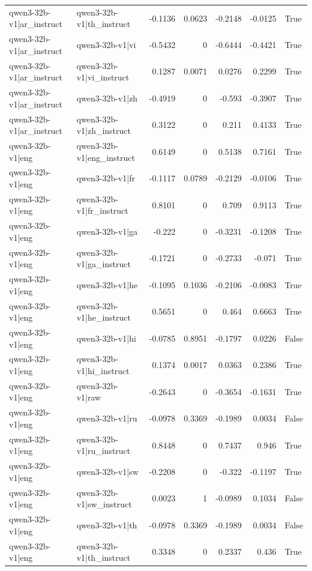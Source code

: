 \begin{table}
\begin{tabular}{l l r r r r l}
qwen3-32b-v1|ar_instruct & qwen3-32b-v1|th_instruct & -0.1136 & 0.0623 & -0.2148 & -0.0125 & True \\
qwen3-32b-v1|ar_instruct & qwen3-32b-v1|vi & -0.5432 & 0 & -0.6444 & -0.4421 & True \\
qwen3-32b-v1|ar_instruct & qwen3-32b-v1|vi_instruct & 0.1287 & 0.0071 & 0.0276 & 0.2299 & True \\
qwen3-32b-v1|ar_instruct & qwen3-32b-v1|zh & -0.4919 & 0 & -0.593 & -0.3907 & True \\
qwen3-32b-v1|ar_instruct & qwen3-32b-v1|zh_instruct & 0.3122 & 0 & 0.211 & 0.4133 & True \\
qwen3-32b-v1|eng & qwen3-32b-v1|eng_instruct & 0.6149 & 0 & 0.5138 & 0.7161 & True \\
qwen3-32b-v1|eng & qwen3-32b-v1|fr & -0.1117 & 0.0789 & -0.2129 & -0.0106 & True \\
qwen3-32b-v1|eng & qwen3-32b-v1|fr_instruct & 0.8101 & 0 & 0.709 & 0.9113 & True \\
qwen3-32b-v1|eng & qwen3-32b-v1|ga & -0.222 & 0 & -0.3231 & -0.1208 & True \\
qwen3-32b-v1|eng & qwen3-32b-v1|ga_instruct & -0.1721 & 0 & -0.2733 & -0.071 & True \\
qwen3-32b-v1|eng & qwen3-32b-v1|he & -0.1095 & 0.1036 & -0.2106 & -0.0083 & True \\
qwen3-32b-v1|eng & qwen3-32b-v1|he_instruct & 0.5651 & 0 & 0.464 & 0.6663 & True \\
qwen3-32b-v1|eng & qwen3-32b-v1|hi & -0.0785 & 0.8951 & -0.1797 & 0.0226 & False \\
qwen3-32b-v1|eng & qwen3-32b-v1|hi_instruct & 0.1374 & 0.0017 & 0.0363 & 0.2386 & True \\
qwen3-32b-v1|eng & qwen3-32b-v1|raw & -0.2643 & 0 & -0.3654 & -0.1631 & True \\
qwen3-32b-v1|eng & qwen3-32b-v1|ru & -0.0978 & 0.3369 & -0.1989 & 0.0034 & False \\
qwen3-32b-v1|eng & qwen3-32b-v1|ru_instruct & 0.8448 & 0 & 0.7437 & 0.946 & True \\
qwen3-32b-v1|eng & qwen3-32b-v1|sw & -0.2208 & 0 & -0.322 & -0.1197 & True \\
qwen3-32b-v1|eng & qwen3-32b-v1|sw_instruct & 0.0023 & 1 & -0.0989 & 0.1034 & False \\
qwen3-32b-v1|eng & qwen3-32b-v1|th & -0.0978 & 0.3369 & -0.1989 & 0.0034 & False \\
qwen3-32b-v1|eng & qwen3-32b-v1|th_instruct & 0.3348 & 0 & 0.2337 & 0.436 & True \\

\end{tabular}
\end{table}
